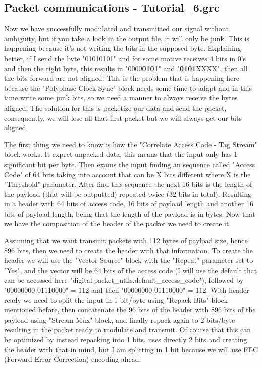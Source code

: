 \documentclass[a4paper, 10pt, conference]{ieeeconf}      %
\begin{document}
    
\subsection{Packet communications - Tutorial\_6.grc}
    Now we have successfully modulated and transmitted our signal without ambiguity, but if you take a look in the output file, it will only be junk. This is happening because it's not writing the bits in the supposed byte. Explaining better, if I send the byte "01010101" and for some motive receives 4 bits in 0's and then the right byte, this results in "0000\textbf{0101}" and "\textbf{0101}XXXX", then all the bits forward are not aligned. This is the problem that is happening here because the "Polyphase Clock Sync" block needs some time to adapt and in this time write some junk bits, so we need a manner to always receive the bytes aligned. The solution for this is packetize our data and send the packet, consequently, we will lose all that first packet but we will always get our bits aligned.
    
    The first thing we need to know is how the "Correlate Access Code - Tag Stream" block works. It expect unpacked data, this means that the input only has 1 significant bit per byte. Then exams the input finding an sequence called "Access Code" of 64 bits taking into account that can be X bits different where X is the "Threshold" parameter. After find this sequence the next 16 bits is the length of the payload (that will be outputted) repeated twice (32 bits in total). Resulting in a header with 64 bits of access code, 16 bits of payload length and another 16 bits of payload length, being that the length of the payload is in bytes. Now that we have the composition of the header of the packet we need to create it.
    
    Assuming that we want transmit packets with 112 bytes of payload size, hence 896 bits, then we need to create the header with that information. 
    To create the header we will use the "Vector Source" block with the "Repeat" parameter set to "Yes", and the vector will be 64 bits of the access code (I will use the default that can be accessed here "digital.packet\_utils.default\_access\_code"), followed by "00000000 01110000" = 112 and then "00000000 01110000" = 112. With header ready we need to split the input in 1 bit/byte using "Repack Bits" block mentioned before, then concatenate the 96 bits of the header with 896 bits of the payload using "Stream Mux" block, and finally repack again to 2 bits/byte resulting in the packet ready to modulate and transmit. Of course that this can be optimized by instead repacking into 1 bits, uses directly 2 bits and creating the header with that in mind, but I am splitting in 1 bit because we will use FEC (Forward Error Correction) encoding ahead.
    
\end{document}
